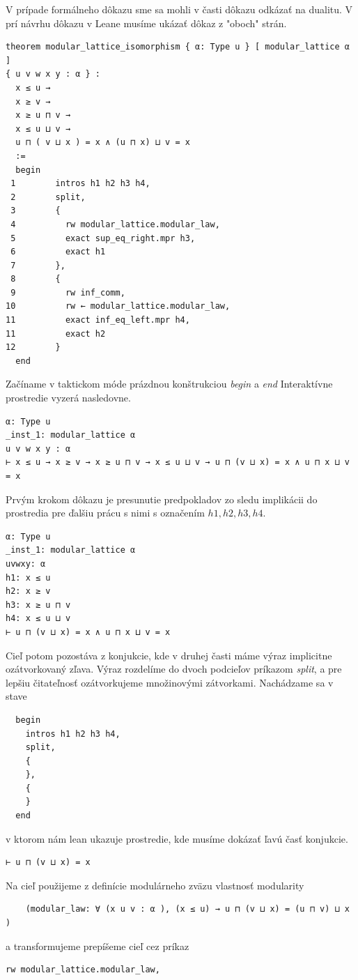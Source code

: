 \documentclass[a4paper,10pt,oneside]{report}%
\begin{document}
    V prípade formálneho dôkazu sme sa mohli v časti dôkazu odkázať na dualitu. 
    V prí návrhu dôkazu v Leane musíme ukázať dôkaz z "oboch" strán.

\begin{lstlisting}
theorem modular_lattice_isomorphism { α: Type u } [ modular_lattice α ]
{ u v w x y : α } :
  x ≤ u →
  x ≥ v →
  x ≥ u ⊓ v →
  x ≤ u ⊔ v →
  u ⊓ ( v ⊔ x ) = x ∧ (u ⊓ x) ⊔ v = x
  :=
  begin
 1        intros h1 h2 h3 h4,
 2        split,
 3        {
 4          rw modular_lattice.modular_law,
 5          exact sup_eq_right.mpr h3,
 6          exact h1
 7        },
 8        {
 9          rw inf_comm,
10          rw ← modular_lattice.modular_law,
11          exact inf_eq_left.mpr h4,
11          exact h2
12        }
  end
\end{lstlisting}
    Začíname v taktickom móde prázdnou konštrukciou \emph{begin} a \emph{end}
    Interaktívne prostredie vyzerá nasledovne.
\begin{lstlisting}
α: Type u
_inst_1: modular_lattice α
u v w x y : α
⊢ x ≤ u → x ≥ v → x ≥ u ⊓ v → x ≤ u ⊔ v → u ⊓ (v ⊔ x) = x ∧ u ⊓ x ⊔ v = x
\end{lstlisting}
    Prvým krokom dôkazu je presunutie predpokladov zo sledu implikácii do
prostredia pre ďalšiu prácu s nimi s označením $h1,h2,h3,h4$.
\begin{lstlisting}
α: Type u
_inst_1: modular_lattice α
uvwxy: α
h1: x ≤ u
h2: x ≥ v
h3: x ≥ u ⊓ v
h4: x ≤ u ⊔ v
⊢ u ⊓ (v ⊔ x) = x ∧ u ⊓ x ⊔ v = x
\end{lstlisting}
    Cieľ potom pozostáva z konjukcie, kde v druhej časti máme výraz implicitne
ozátvorkovaný zľava.
    Výraz rozdelíme do dvoch podcieľov príkazom \emph{split}, a pre lepšiu
čitateľnosť ozátvorkujeme množinovými zátvorkami. Nachádzame sa v stave
\begin{lstlisting}
  begin
    intros h1 h2 h3 h4,
    split,
    {
    },
    {
    }
  end
\end{lstlisting}
v ktorom nám lean ukazuje prostredie, kde musíme dokázať ľavú časť konjukcie.
\begin{lstlisting}
⊢ u ⊓ (v ⊔ x) = x
\end{lstlisting}
Na cieľ použijeme z definície modulárneho zväzu vlastnosť modularity
\begin{lstlisting}
    (modular_law: ∀ (x u v : α ), (x ≤ u) → u ⊓ (v ⊔ x) = (u ⊓ v) ⊔ x )
\end{lstlisting}
a transformujeme prepíšeme cieľ cez príkaz
\begin{lstlisting}
rw modular_lattice.modular_law,
\end{lstlisting}
\end{document}
